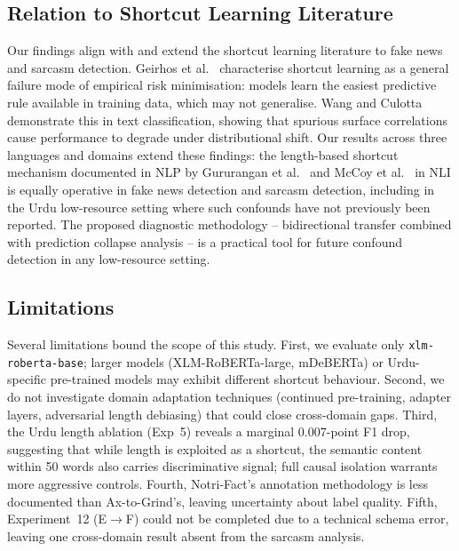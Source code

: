 \documentclass[conference]{IEEEtran}
\begin{document}
\subsection{Relation to Shortcut Learning Literature}

Our findings align with and extend the shortcut learning literature to
fake news and sarcasm detection. Geirhos et
al.~\cite{geirhos2020shortcut} characterise shortcut learning as a
general failure mode of empirical risk minimisation: models learn the
easiest predictive rule available in training data, which may not
generalise. Wang and Culotta~\cite{wang2021spurious} demonstrate this
in text classification, showing that spurious surface correlations
cause performance to degrade under distributional shift. Our results
across three languages and domains extend these findings: the
length-based shortcut mechanism documented in NLP by Gururangan et
al.~\cite{gururangan2018annotation} and McCoy et
al.~\cite{mccoy2019right} in NLI is equally operative in fake news
detection and sarcasm detection, including in the Urdu low-resource
setting where such confounds have not previously been reported. The
proposed diagnostic methodology -- bidirectional transfer combined
with prediction collapse analysis -- is a practical tool for future
confound detection in any low-resource setting.

\subsection{Limitations}

Several limitations bound the scope of this study. First, we evaluate
only \texttt{xlm-roberta-base}; larger models (XLM-RoBERTa-large,
mDeBERTa) or Urdu-specific pre-trained models may exhibit different
shortcut behaviour. Second, we do not investigate domain adaptation
techniques (continued pre-training, adapter layers, adversarial length
debiasing) that could close cross-domain gaps. Third, the Urdu length
ablation (Exp~5) reveals a marginal 0.007-point F1 drop, suggesting
that while length is exploited as a shortcut, the semantic content
within 50 words also carries discriminative signal; full causal
isolation warrants more aggressive controls. Fourth, Notri-Fact's
annotation methodology is less documented than Ax-to-Grind's, leaving
uncertainty about label quality. Fifth, Experiment~12 (E$\to$F)
could not be completed due to a technical schema error, leaving one
cross-domain result absent from the sarcasm analysis.

\end{document}
